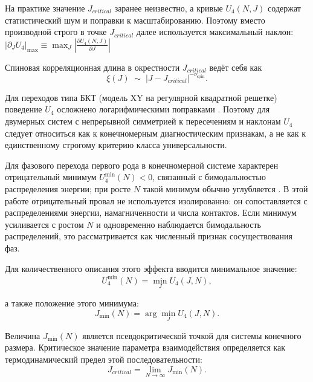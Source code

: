 На практике значение $J_{critical}$ заранее неизвестно, а
кривые $U_4(N,J)$ содержат статистический шум и поправки к масштабированию.
Поэтому вместо производной строго в точке $J_{critical}$ далее используется
максимальный наклон: $  \left|
\partial_J U_4
\right|_{\max}
\equiv
\max_J
\left|
\frac{\partial U_4(N,J)}{\partial J}
\right| $ 

 Спиновая корреляционная длина в окрестности $J_{critical}$ ведёт себя как
 \[
 \xi(J)\;\sim\; |J-J_{critical}|^{-\nu_{\mathrm{spin}}}.
 \]
 
   Для переходов типа БКТ (модель XY на регулярной квадратной решетке) поведение $U_4$ осложнено логарифмическими поправками \cite{hasenbusch2008binder}. Поэтому для двумерных систем с непрерывной
   симметрией к пересечениям и наклонам $U_4$ следует относиться как к
   конечномерным диагностическим признакам, а не как к единственному строгому
   критерию класса универсальности.
 
 
 Для фазового перехода первого рода в конечномерной системе характерен отрицательный минимум $U_4^{\min}(N)<0$, связанный с бимодальностью распределения энергии; при росте $N$ такой минимум обычно углубляется \cite{PhysRevB.30.1477}.   
 В этой работе отрицательный провал не используется изолированно: он сопоставляется с распределениями энергии, намагниченности и числа контактов. 
 Если минимум усиливается с ростом $N$ и одновременно наблюдается бимодальность распределений, это рассматривается как численный признак сосуществования фаз.   
 
 Для количественного описания этого эффекта вводится
 минимальное значение:
   \begin{equation}
 	\label{binder_minimum}
 	U_4^{\min}(N)
 	=
 	\min_J U_4(J,N), 
 \end{equation}
 
 а также положение этого минимума:
 \begin{equation}
 	\label{binder_minimum_position}
 	J_{\min}(N)
 	=
 	\arg\min_J U_4(J,N).
 \end{equation} 
 
 Величина $J_{\min}(N)$ является псевдокритической точкой для системы конечного
 размера.
  Критическое значение параметра взаимодействия определяется как
 термодинамический предел этой последовательности:
 \begin{equation}
 	\label{binder_first_order_jcritical}
 	J_{critical}
 	=
 	\lim_{N\to\infty} J_{\min}(N).
 \end{equation}
 
